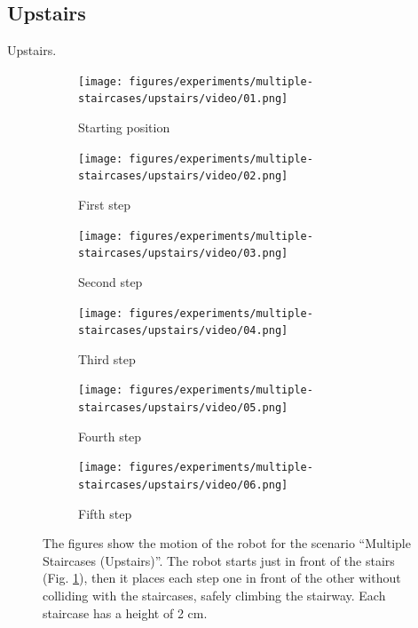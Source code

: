 \subsection{Upstairs}
Upstairs.
\begin{figure}
  \begin{subfigure}{0.48\textwidth}
    \texttt{[image: figures/experiments/multiple-staircases/upstairs/video/01.png]}
    \caption{Starting position}
    \label{fig:exp:ms:up:frame1}
  \end{subfigure}\hspace*{\fill}
  \begin{subfigure}{0.48\textwidth}
    \texttt{[image: figures/experiments/multiple-staircases/upstairs/video/02.png]}
    \caption{First step}
  \end{subfigure}
  \begin{subfigure}{0.48\textwidth}
    \texttt{[image: figures/experiments/multiple-staircases/upstairs/video/03.png]}
    \caption{Second step}
  \end{subfigure}\hspace*{\fill}
  \begin{subfigure}{0.48\textwidth}
    \texttt{[image: figures/experiments/multiple-staircases/upstairs/video/04.png]}
    \caption{Third step}
  \end{subfigure}
  \begin{subfigure}{0.48\textwidth}
    \texttt{[image: figures/experiments/multiple-staircases/upstairs/video/05.png]}
    \caption{Fourth step}
  \end{subfigure}\hspace*{\fill}
  \begin{subfigure}{0.48\textwidth}
    \texttt{[image: figures/experiments/multiple-staircases/upstairs/video/06.png]}
    \caption{Fifth step}
  \end{subfigure}
  \caption{The figures show the motion of the robot for the scenario
      ``Multiple Staircases (Upstairs)''. The robot starts just in 
      front of the stairs (Fig. \ref{fig:exp:ms:up:frame1}), then it places 
      each step one in front of the other without colliding with the staircases,
      safely climbing the stairway. Each staircase has a height of 2 cm.}
  \label{fig:experiments:multiple-staircases:upstairs:videoframes}
\end{figure}

